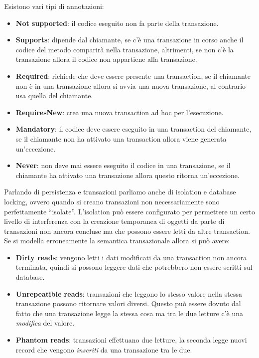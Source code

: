 Esistono vari tipi di annotazioni:
\begin{itemize}
      \item \textbf{Not supported}: il codice eseguito non fa parte della
            transazione.
      \item \textbf{Supports}: dipende dal chiamante, se c'è una transazione in
            corso anche il codice del metodo comparirà nella transazione,
            altrimenti, se non c'è la transazione allora il codice non appartiene
            alla transazione.
      \item \textbf{Required}: richiede che deve essere presente una transaction,
            se il chiamante non è in una transazione allora si avvia una nuova
            transazione, al contrario usa quella del chiamante.
      \item \textbf{RequiresNew}: crea una nuova transaction ad hoc per l'esecuzione.
      \item \textbf{Mandatory}: il codice deve essere eseguito in una transaction
            del chiamante, se il chiamante non ha attivato una transaction allora
            viene generata un'eccezione.
      \item \textbf{Never}: non deve mai essere eseguito il codice in una transazione,
            se il chiamante ha attivato una transazione allora questo ritorna
            un'eccezione.
\end{itemize}
Parlando di persistenza e transazioni parliamo anche di isolation e database
locking, ovvero quando si creano transazioni non necessariamente sono perfettamente
“isolate”. L'isolation può essere configurato per permettere un certo livello di
interferenza con la creazione temporanea di oggetti da parte di transazioni non
ancora concluse ma che possono essere letti da altre transaction. Se si modella
erroneamente la semantica transazionale allora si può avere:
\begin{itemize}
      \item \textbf{Dirty reads}: vengono letti i dati modificati da una transaction
            non ancora terminata, quindi si possono leggere dati che potrebbero
            non essere scritti sul database.
      \item \textbf{Unrepeatible reads}: transazioni che leggono lo stesso valore
            nella stessa transazione possono ritornare valori diversi. Questo
            può essere dovuto dal fatto che una transazione legge la stessa cosa
            ma tra le due letture c'è una \textit{modifica} del valore.
      \item \textbf{Phantom reads}: transazioni effettuano due letture, la seconda
            legge nuovi record che vengono \textit{inseriti} da una transazione
            tra le due.
\end{itemize}
